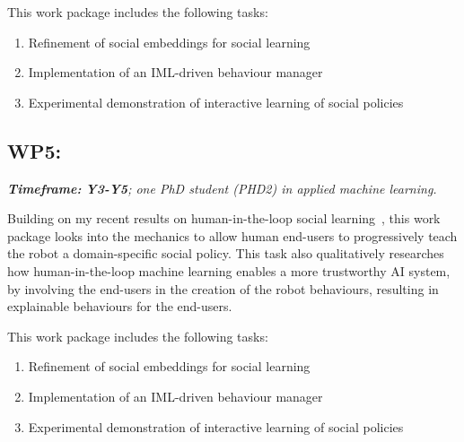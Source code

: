 This work package includes the following tasks:

\begin{enumerate}[label=\textbf{T5.\arabic*}]
    \item{Refinement of social embeddings for social learning}
    \item{Implementation of an IML-driven behaviour manager}
    \item{Experimental demonstration of interactive learning of social policies}
\end{enumerate}

\subsection{WP5: \textbf{\wpFive}}
\emph{    \textbf{Timeframe:} \textbf{Y3-Y5}; one PhD student (PHD2) in applied machine
    learning.}


Building on my recent results on human-in-the-loop social
learning~\cite{senft2017supervised, senft2019teaching,
winkle2020couch,winkle2021leador}, this work package looks into the mechanics to
allow human end-users to progressively teach the robot a domain-specific social
policy.  This task also qualitatively researches how human-in-the-loop machine
learning enables a more trustworthy AI system, by involving the end-users in the
creation of the robot behaviours, resulting in explainable behaviours for the
end-users.

%
%
%
%

This work package includes the following tasks:

\begin{enumerate}[label=\textbf{T5.\arabic*}]
    \item{Refinement of social embeddings for social learning}
    \item{Implementation of an IML-driven behaviour manager}
    \item{Experimental demonstration of interactive learning of social policies}
\end{enumerate}

